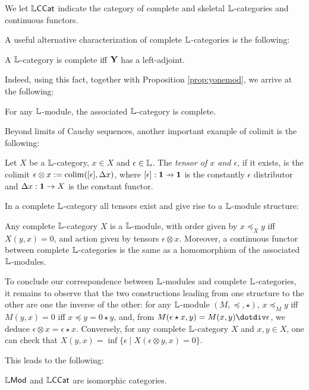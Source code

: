 We let $\mathbb{L}\mathsf{CCat}$ indicate the category of complete and skeletal $\mathbb{L}$-categories and continuous functors. 

A useful alternative characterization of complete $\mathbb{L}$-categories is the following:
\begin{proposition}
A $\mathbb{L}$-category is complete iff $\mathbf{Y}$ has a left-adjoint. 
\end{proposition}
Indeed, using this fact, together with Proposition \ref{prop:yonemod}, we arrive at the following:
\begin{proposition}
For any $\mathbb{L}$-module, the associated $\mathbb{L}$-category is complete. 
\end{proposition}

Beyond limits of Cauchy sequences, another important example of colimit is the following:
\begin{definition}
Let $X$ be a $\mathbb{L}$-category, $x\in X$ and $\epsilon \in \mathbb{L}$. The \emph{tensor of $x$ and $\epsilon$}, if it exists, is the colimit $\epsilon \otimes x:= \mathrm{colim}( [\epsilon],\Delta x)$, where
$[\epsilon]: \B 1\pfun \B 1$ is the constantly $\epsilon$ distributor
and $\Delta x:\mathbf{1}\to X$ is the constant functor. 
\end{definition}

In a complete $\mathbb{L}$-category all tensors exist and give rise to a $\mathbb{L}$-module structure:
\begin{proposition}
Any complete $\mathbb{L}$-category $X$ is a $\mathbb{L}$-module, with order given by $x\preceq_{X}y $ iff $X(y,x)=0$, and 
action given by tensors $\epsilon \otimes x$. Moreover, a continuous functor between complete $\mathbb{L}$-categories is the same as a homomorphism of the associated $\mathbb{L}$-modules. 
\end{proposition}


To conclude our correspondence between $\mathbb{L}$-modules and complete $\mathbb{L}$-categories, it remains to observe that the 
two constructions leading from one structure to the other are one the inverse of the other: for any $\mathbb{L}$-module $(M,\preceq,\star)$,
$x\preceq_{M}y$ iff $M(y,x)=0$ iff $x\preceq y=0\star y$, and, from  
$M(\epsilon \star x, y)= M(x,y)\dotdiv \epsilon$, we deduce $\epsilon\otimes x=\epsilon \star x$. 
Conversely, 
for any complete $\mathbb{L}$-category $X$ and $x,y\in X$, one can check that 
$X(y,x)=\inf\{ \epsilon \mid X(\epsilon\otimes y,x )=0\}$.

This leads to the following:


\begin{theorem}
$\mathbb{L}\mathsf{Mod}$ and $\mathbb{L}\mathsf{CCat}$ are isomorphic categories.
\end{theorem}


